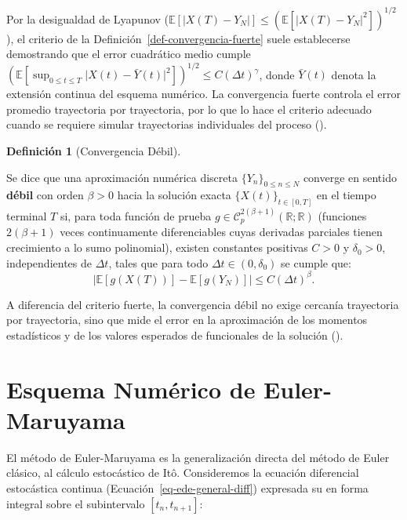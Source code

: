 \documentclass[
  spanish,
  us-letterpaper,
]{scrreprt}
\numberwithin{equation}{section}
\theoremstyle{plain}
\theoremstyle{plain}
\theoremstyle{definition}
\newtheorem{definition}{Definición}[chapter]
\theoremstyle{plain}
\theoremstyle{remark}
\begin{document}
Por la desigualdad de Lyapunov
(\(\mathbb{E}[\vert X(T) - Y_N \vert] \le (\mathbb{E}[\vert X(T) - Y_N \vert^2])^{1/2}\)),
el criterio de la Definición~\ref{def-convergencia-fuerte} suele
establecerse demostrando que el error cuadrático medio cumple
\(\displaystyle \left(\mathbb{E}\left[\sup_{0 \le t \le T} \vert X(t) - \bar{Y}(t) \vert^2\right]\right)^{1/2} \le C(\Delta t)^\gamma\),
donde \(\bar{Y}(t)\) denota la extensión continua del esquema numérico.
La convergencia fuerte controla el error promedio trayectoria por
trayectoria, por lo que lo hace el criterio adecuado cuando se requiere
simular trayectorias individuales del proceso
().

\begin{definition}[Convergencia
Débil]\protect\hypertarget{def-convergencia-debil}{}\label{def-convergencia-debil}

Se dice que una aproximación numérica discreta
\(\{Y_n\}_{0 \le n \le N}\) converge en sentido \textbf{débil} con orden
\(\beta > 0\) hacia la solución exacta \(\{X(t)\}_{t \in [0, T]}\) en el
tiempo terminal \(T\) si, para toda función de prueba
\(g \in \mathcal{C}_p^{2(\beta+1)}(\mathbb{R}; \mathbb{R})\) (funciones
\(2(\beta+1)\) veces continuamente diferenciables cuyas derivadas
parciales tienen crecimiento a lo sumo polinomial), existen constantes
positivas \(C > 0\) y \(\delta_0 > 0\), independientes de \(\Delta t\),
tales que para todo \(\Delta t \in (0, \delta_0)\) se cumple que: \[
\left\vert \mathbb{E}[g(X(T))] - \mathbb{E}[g(Y_N)] \right\vert \le C (\Delta t)^\beta.
\]

\end{definition}

A diferencia del criterio fuerte, la convergencia débil no exige
cercanía trayectoria por trayectoria, sino que mide el error en la
aproximación de los momentos estadísticos y de los valores esperados de
funcionales de la solución ().

\section{Esquema Numérico de Euler-Maruyama}\label{sec-euler-maruyama}

El método de Euler-Maruyama es la generalización directa del método de
Euler clásico, al cálculo estocástico de Itô. Consideremos la ecuación
diferencial estocástica continua (Ecuación~\ref{eq-ede-general-diff})
expresada su en forma integral sobre el subintervalo \([t_n, t_{n+1}]:\)
\end{document}
